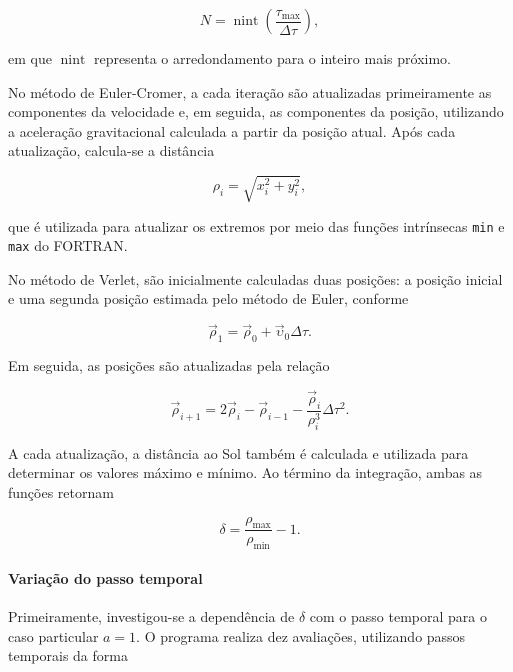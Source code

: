 \documentclass[12pt,a4paper]{article}
\begin{document}
\begin{equation}
    N=\operatorname{nint}\left(
    \frac{\tau_{\max}}{\Delta\tau}
    \right),
\end{equation}

em que $\operatorname{nint}$ representa o arredondamento
para o inteiro mais próximo.

No método de Euler-Cromer, a cada iteração são atualizadas
primeiramente as componentes da velocidade e, em seguida,
as componentes da posição, utilizando a aceleração
gravitacional calculada a partir da posição atual.
Após cada atualização, calcula-se a distância

\begin{equation}
    \rho_i=\sqrt{x_i^2+y_i^2},
\end{equation}

que é utilizada para atualizar os extremos por meio
das funções intrínsecas \texttt{min} e \texttt{max}
do FORTRAN.

No método de Verlet, são inicialmente calculadas
duas posições: a posição inicial e uma segunda posição
estimada pelo método de Euler, conforme

\begin{equation}
    \vec{\rho}_1=
    \vec{\rho}_0+\vec{\upsilon}_0\Delta\tau.
\end{equation}

Em seguida, as posições são atualizadas pela relação

\begin{equation}
    \vec{\rho}_{i+1}
    =
    2\vec{\rho}_i-\vec{\rho}_{i-1}
    -
    \frac{\vec{\rho}_i}{\rho_i^3}\Delta\tau^2.
\end{equation}

A cada atualização, a distância ao Sol também é
calculada e utilizada para determinar os valores
máximo e mínimo. Ao término da integração, ambas
as funções retornam

\begin{equation}
    \delta=\frac{\rho_{\max}}{\rho_{\min}}-1.
\end{equation}

\paragraph{Variação do passo temporal}

Primeiramente, investigou-se a dependência de $\delta$
com o passo temporal para o caso particular $a=1$.
O programa realiza dez avaliações, utilizando passos
temporais da forma
\end{document}
